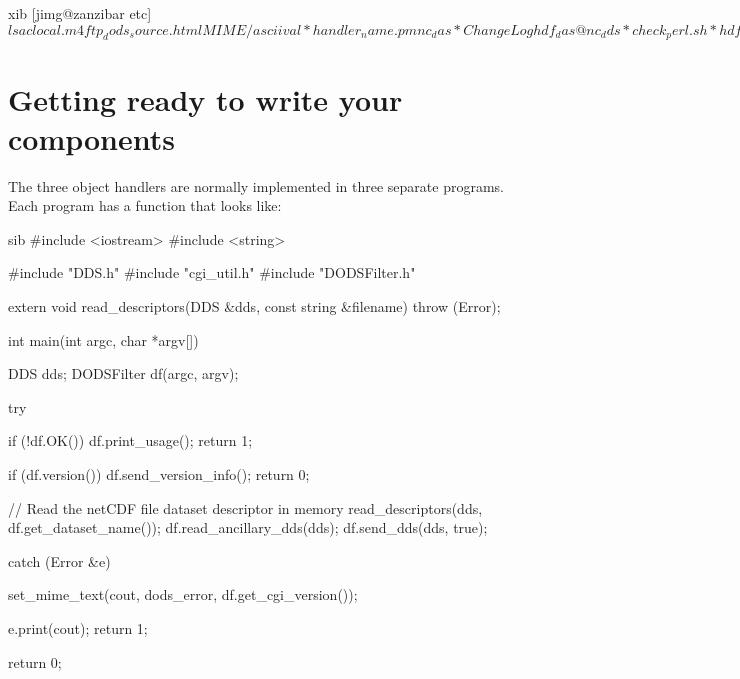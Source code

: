 \documentclass{dods-paper}
\begin{document}
\begin{vcode}{xib}
[jimg@zanzibar etc]$ ls
aclocal.m4            ftp_dods_source.html   MIME/
asciival*             handler_name.pm        nc_das*
ChangeLog             hdf_das@               nc_dds*
check_perl.sh*        hdf_dds@               nc_dods*
common_tests.exp      hdf_dods*              nightly_dods_build.conf
config.guess*         HTML/
nightly_dods_build.conf.example
config.sub*           HTTP/                  nightly_dods_build.sh*
COPYRIGHT             INSTALL-clients        nph-dods*
CVS/                  INSTALL-matlab-client  nph-dods.in*
cvsdate*              installServers         printenv*
def*                  INSTALL-servers        README
deflate*              install-sh*            README-Matlab-GUI
depend.sh*            jg_das*                tar-builder.pl*
DODS_Cache.pm         jg_dds*                test-dispatch.sh*
DODS_Dispatch.pm      jg_dods*               ud_aclocal.m4
dods.ini              jgofs_objects_readme*  update-manifest.pl*
ff_das*               localize.sh*           update-manifest.pl~*
ff_dds*               LWP/                   usage*
ff_dods*              Makefile.common        usage~*
FilterDirHTML.pm      mat_das*               usage-jg*
ftp_dods_binary.html  mat_dds*               www_int*
ftp_dods_ml_gui.html  mat_dods*
[jimg@zanzibar etc]$ 
\end{vcode}

\section{Getting ready to write your components}

The three object handlers are normally implemented in three separate
programs.  Each program has a  function that looks like:

\begin{vcode}{sib} 
#include <iostream>
#include <string>

#include "DDS.h"
#include "cgi_util.h"
#include "DODSFilter.h"

extern void read_descriptors(DDS &dds, const string &filename)
    throw  (Error);

int 
main(int argc, char *argv[])
{
    DDS dds;
    DODSFilter df(argc, argv);
       
    try {
        if (!df.OK()) {
            df.print_usage();
            return 1;
        }
        
        if (df.version()) {
            df.send_version_info();
            return 0;
        }

        // Read the netCDF file dataset descriptor in memory
        read_descriptors(dds,  df.get_dataset_name());
        df.read_ancillary_dds(dds);
        df.send_dds(dds, true);
    }

    catch (Error &e) {
        set_mime_text(cout, dods_error,
        df.get_cgi_version());

        e.print(cout);
        return 1;
    }

    return 0;
}
\end{vcode}
\end{document}
